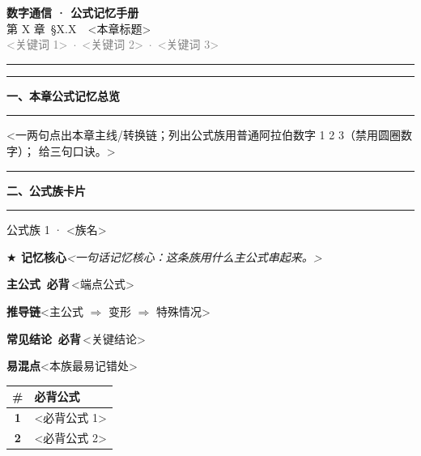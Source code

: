 \documentclass[11pt,a4paper]{ctexart}
\newcommand{\bibei}{\colorbox{red!14}{\textcolor{red!70!black}{\,\scriptsize\bfseries\sffamily 必背\,}}}
\newcommand{\ketui}{\colorbox{blue!14}{\textcolor{blue!55!black}{\,\scriptsize\bfseries\sffamily 可推\,}}}
\newcommand{\gainian}{\colorbox{gray!18}{\textcolor{black!55}{\,\scriptsize\bfseries\sffamily 概念\,}}}
\newcommand{\fld}[2]{\par\noindent\textbf{#1}\quad #2\par\smallskip}
\newcommand{\secbar}[1]{\par\addvspace{12pt}\noindent
  \textcolor{blue!50!black}{\rule[-2pt]{5pt}{16pt}}\hspace{6pt}%
  {\Large\bfseries\textcolor{blue!35!black}{#1}}\par
  \addvspace{2pt}\noindent\textcolor{blue!20}{\rule{\linewidth}{0.6pt}}\par\addvspace{4pt}}
\newcommand{\core}[1]{\par\noindent
  {\textcolor{orange!75!black}{\textbf{$\bigstar$ 记忆核心}}}\quad\textit{#1}\par\smallskip}
\begin{document}
\begin{center}
{\Huge\bfseries\textcolor{blue!40!black}{数字通信 · 公式记忆手册}}\\[3pt]
{\Large 第 X 章\ \S X.X\ \ <本章标题>}\\[2pt]
{\small\textcolor{gray}{<关键词 1> \,$\cdot$\, <关键词 2> \,$\cdot$\, <关键词 3>}}
\end{center}
\vspace{2pt}
\noindent\textcolor{blue!30}{\rule{\linewidth}{1.2pt}}

\secbar{一、本章公式记忆总览}

<一两句点出本章主线/转换链；列出公式族用普通阿拉伯数字 1 2 3（禁用圆圈数字）；
给三句口诀。>

\secbar{二、公式族卡片}

\begin{familybox}{公式族 1 · <族名>}
\core{<一句话记忆核心：这条族用什么主公式串起来。>}
\fld{主公式 \bibei}{<端点公式>}          %
\fld{推导链}{<主公式 $\Rightarrow$ 变形 $\Rightarrow$ 特殊情况>}
\fld{常见结论 \bibei}{<关键结论>}
\fld{易混点}{<本族最易记错处>}
\end{familybox}


\begin{tcolorbox}[enhanced, breakable, sharp corners,
  colback=red!2, colframe=red!55!black, boxrule=0.6pt,
  title={\bfseries\sffamily 三、必背公式极简版},
  colbacktitle=red!60!black, coltitle=white,
  left=10pt, right=10pt, top=4pt, bottom=4pt]
\renewcommand{\arraystretch}{1.45}
\noindent\begin{tabularx}{\linewidth}{@{}>{\bfseries\color{red!60!black}}c X@{}}
\toprule
\rmfamily\color{black}\textbf{\#} & \textbf{必背公式} \\
\midrule
1 & <必背公式 1> \\
2 & <必背公式 2> \\
\bottomrule
\end{tabularx}
\end{tcolorbox}
\end{document}
